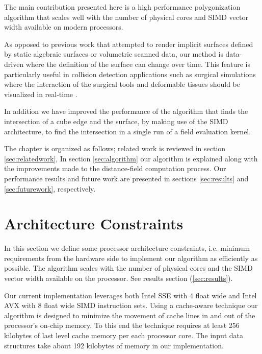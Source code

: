 The main contribution presented here is a high performance polygonization algorithm that scales well with the 
number of physical cores and SIMD vector width available on modern processors.

As opposed to previous work that attempted to render implicit surfaces defined by static algebraic surfaces or 
volumetric scanned data, our method is data-driven where the definition of the surface can change over time. This feature 
is particularly useful in collision detection applications such as surgical simulations where the interaction
of the surgical tools and deformable tissues should be visualized in real-time \cite{Laycock2007}. 
 
In addition we have improved the performance of the algorithm that finds the intersection of a cube edge and the surface, by making use of the SIMD architecture, 
to find the intersection in a single run of a field evaluation kernel.


The chapter is organized as follows;  related work is reviewed in section \ref{sec:relatedwork}, 
In section \ref{sec:algorithm} our algorithm is explained along with the improvements made to the 
distance-field computation process. Our performance results and future work are presented 
in sections \ref{sec:results} and \ref{sec:futurework}, respectively.

\section{Architecture Constraints}\label{sec:architecture}
In this section we define some processor architecture constraints, i.e. minimum 
requirements from the hardware side to implement our algorithm as efficiently as possible.
The algorithm scales with the number of physical cores and the SIMD vector width available on the processor.  
See results section (\ref{sec:results}). 

Our current implementation leverages both Intel SSE with 4 float wide and Intel AVX with 8 float wide SIMD instruction sets.
Using a cache-aware technique our algorithm is designed to minimize the movement of cache lines in and out of the processor's on-chip 
memory. To this end the technique requires at least 256 kilobytes of last level cache memory per each processor core. 
The input data structures take about 192 kilobytes of memory in our implementation.


